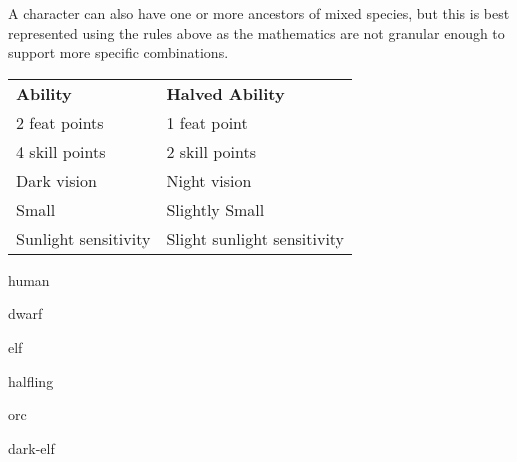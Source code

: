 \begin{multicols*}{2}
    A character can also have one or more ancestors of mixed species, but this is
    best represented using the rules above as the mathematics are not granular
    enough to support more specific combinations.
    \begin{center}
        \unclassedrowcolors
        \begin{tabularx}{0.5\textwidth}{l X}
            \textbf{Ability} & \textbf{Halved Ability} \\
            2 feat points & 1 feat point \\
            4 skill points & 2 skill points \\
            Dark vision & Night vision \\
            Small & Slightly Small \\
            Sunlight sensitivity & Slight sunlight sensitivity \\
        \end{tabularx}
        \label{tab:inherited-abilities}
    \end{center}

    {human}

    {dwarf}

    {elf}

    {halfling}

    {orc}

    {dark-elf}
\end{multicols*}

